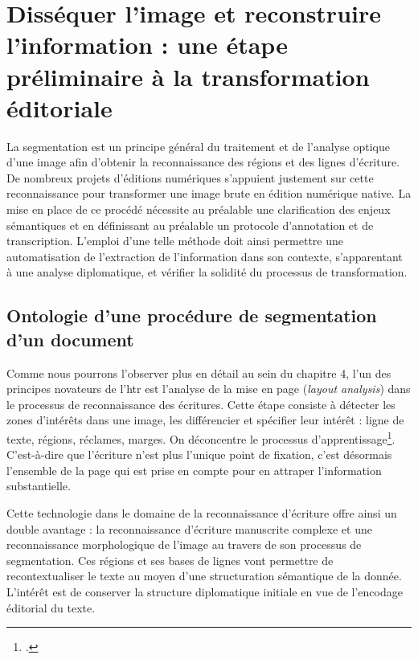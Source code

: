 	\section{Disséquer l'image et reconstruire l'information : une étape préliminaire à la transformation éditoriale}
	
	La segmentation est un principe général du traitement et de l'analyse optique d’une image afin d’obtenir la reconnaissance des régions et des lignes d’écriture. De nombreux projets d'éditions numériques s'appuient justement sur cette reconnaissance pour transformer une image brute en édition numérique native.
	La mise en place de ce procédé nécessite au préalable une clarification des enjeux sémantiques et  en définissant au préalable un protocole d'annotation et de transcription. L'emploi d'une telle méthode doit ainsi permettre une automatisation de l'extraction de l'information dans son contexte, s'apparentant à une analyse diplomatique, et vérifier la solidité du processus de transformation.
	
	\subsection{Ontologie d'une procédure de segmentation d'un document}
	
	Comme nous pourrons l'observer plus en détail au sein du chapitre 4, l'un des principes novateurs de l'\gls{htr} est l'analyse de la mise en page (\textit{layout analysis}) dans le processus de reconnaissance des écritures. Cette étape consiste à détecter les zones d’intérêts dans une image, les différencier et spécifier leur intérêt : ligne de texte, régions, réclames, marges. On déconcentre le processus d'apprentissage\footcite[p.~25]{noemieOCRHTRGraphie2022}. C'est-à-dire que l'écriture n'est plus l'unique point de fixation, c'est désormais l'ensemble de la page qui est prise en compte pour en attraper l'information substantielle.
	
	Cette technologie dans le domaine de la reconnaissance d'écriture offre ainsi un double avantage : la reconnaissance d'écriture manuscrite complexe et une reconnaissance morphologique de l'image au travers de son processus de segmentation. Ces régions et ses bases de lignes vont permettre de recontextualiser le texte au moyen d'une structuration sémantique de la donnée. L'intérêt est de conserver la structure diplomatique initiale en vue de l'encodage éditorial du texte. 
	
